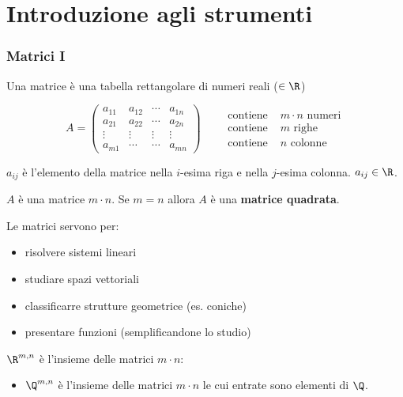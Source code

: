 \part{Introduzione agli strumenti}
\section{Matrici I}

Una matrice è una tabella rettangolare di numeri reali ($\in\R$)

\[
A=\begin{pmatrix}
a_{1 1} & a_{1 2} & \cdots & a_{1 n} \\
a_{2 1} & a_{2 2} & \cdots & a_{2 n}\\
\vdots & \vdots & \vdots & \vdots \\
a_{m 1} & \cdots & \cdots & a_{m n}
\end{pmatrix}\qquad \begin{aligned}
\text{contiene } &m\cdot n \text{ numeri}\\
\text{contiene } &m \text{ righe}\\
\text{contiene } &n \text{ colonne}
\end{aligned}
\]

$a_{ij}$ è l'elemento della matrice nella $i$-esima riga e nella $j$-esima colonna. $a_{ij}\in\R$.

$A$ è una matrice $m\cdot n$. Se $m=n$ allora $A$ è una \textbf{matrice quadrata}.

Le matrici servono per:
\begin{itemize}
\item risolvere sistemi lineari
\item studiare spazi vettoriali
\item classificarre strutture geometrice (es. coniche)
\item presentare funzioni (semplificandone lo studio)
\end{itemize}

$\R^{m,n}$ è l'insieme delle matrici $m\cdot n$:
\begin{itemize}
\item $\Q^{m, n}$ è l'insieme delle matrici $m\cdot n$ le cui entrate sono elementi di $\Q$.
\end{itemize}

